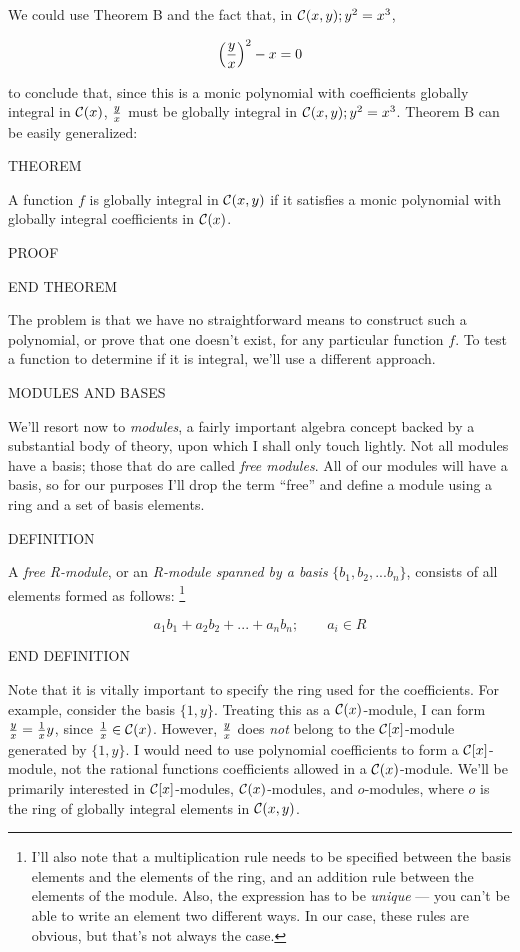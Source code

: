 We could use Theorem B and the fact that, in ${\cal C}(x,y); y^2=x^3$,

	$$ \left({y \over x}\right)^2 - x = 0 $$

to conclude that, since this is a monic polynomial with coefficients
globally integral in ${\cal C}(x)$, $y \over x$ must be globally
integral in ${\cal C}(x,y); y^2=x^3$.  Theorem B can be easily
generalized:

THEOREM

A function $f$ is globally integral in ${\cal C}(x,y)$ if it
satisfies a monic polynomial with globally integral coefficients in
${\cal C}(x)$.

PROOF

END THEOREM

The problem is that we have no straightforward means to construct
such a polynomial, or prove that one doesn't exist, for any
particular function $f$.  To test a function to determine
if it is integral, we'll use a different approach.


MODULES AND BASES

We'll resort now to {\it modules}, a fairly important algebra concept
backed by a substantial body of theory, upon which I shall only touch
lightly.  Not all modules have a basis; those that do are called {\it
free modules}.  All of our modules will have a basis, so for our
purposes I'll drop the term ``free'' and define a module using a ring
and a set of basis elements.

DEFINITION

A {\it free R-module}, or an {\it R-module spanned by a basis}
$\{b_1, b_2, ... b_n\}$, consists of all elements formed as follows:
\footnote{I'll also note that a multiplication rule needs to be specified
between the basis elements and the elements of the ring, and an
addition rule between the elements of the module.  Also,
the expression has to be {\it unique} --- you can't be
able to write an element two different ways.  In our
case, these rules are obvious, but that's not always the case.}

	$$ a_1 b_1 + a_2 b_2 + ... + a_n b_n; \qquad a_i \in R $$


END DEFINITION

Note that it is vitally important to specify the ring used for the
coefficients.  For example, consider the basis $\{1, y\}$.  Treating
this as a ${\cal C}(x)$-module, I can form ${y \over x} = {1 \over x}
y$, since ${1 \over x} \in {\cal C}(x)$.  However, $y \over x$ does {\it
not} belong to the ${\cal C}[x]$-module generated by $\{1, y\}$.  I
would need to use polynomial coefficients to form a ${\cal
C}[x]$-module, not the rational functions coefficients allowed in a
${\cal C}(x)$-module.  We'll be primarily interested in ${\cal C}[x]$-modules,
${\cal C}(x)$-modules, and $o$-modules, where $o$ is the ring
of globally integral elements in ${\cal C}(x,y)$.


